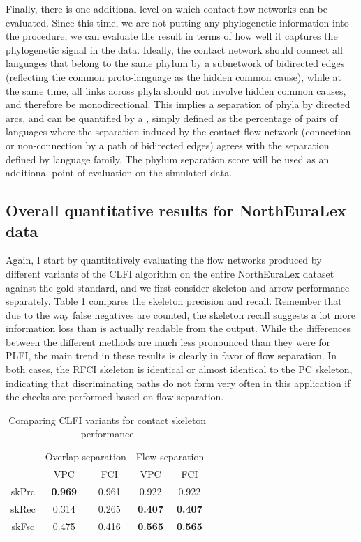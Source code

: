 Finally, there is one additional level on which contact flow networks can be evaluated. Since this time, we are not putting any phylogenetic information into the procedure, we can evaluate the result in terms of how well it captures the phylogenetic signal in the data. Ideally, the contact network should connect all languages that belong to the same phylum by a subnetwork of bidirected edges (reflecting the common proto-language as the hidden common cause), while at the same time, all links across phyla should not involve hidden common causes, and therefore be monodirectional. This implies a separation of phyla by directed arcs, and can be quantified by a \textit{}, simply defined as the percentage of pairs of languages where the separation induced by the contact flow network (connection or non-connection by a path of bidirected edges) agrees with the separation defined by language family. The phylum separation score will be used as an additional point of evaluation on the 
simulated data.

\subsection{Overall quantitative results for NorthEuraLex data}
Again, I start by quantitatively evaluating the flow networks produced by different variants of the CLFI algorithm on the entire NorthEuraLex dataset against the gold standard, and we first consider skeleton and arrow performance separately. Table \ref{contact-skeleton-evaluation-nelex} compares the skeleton precision and recall. Remember that due to the way false negatives are counted, the skeleton recall suggests a lot more information loss than is actually readable from the output. While the differences between the different methods are much less pronounced than they were for PLFI, the main trend in these results is clearly in favor of flow separation. In both cases, the RFCI skeleton is identical or almost identical to the PC skeleton, indicating that discriminating paths do not form very often in this application if the checks are performed based on flow separation.

\begin{table}
 \centering
 \begin{tabular}{ccccc}
  \hline \hline
   & \multicolumn{2}{l}{Overlap separation} & \multicolumn{2}{l}{Flow separation}\\ 
   & VPC & FCI & VPC & FCI\\ 
  \hline
  skPrc & \textbf{0.969} & 0.961 & 0.922 & 0.922\\
  skRec & 0.314 & 0.265 & \textbf{0.407} & \textbf{0.407}\\
  skFsc & 0.475 & 0.416 & \textbf{0.565} & \textbf{0.565}\\
  \hline
 \end{tabular}
 \caption{Comparing CLFI variants for contact skeleton performance}
 \label{contact-skeleton-evaluation-nelex}
\end{table}

